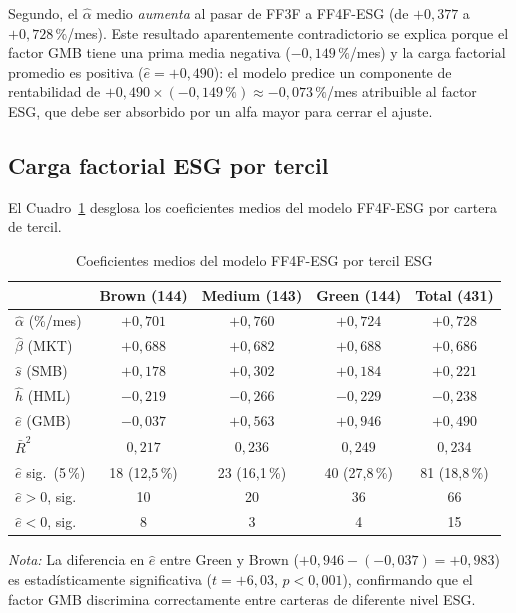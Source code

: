 \documentclass[12pt, a4paper]{article}
\begin{document}
Segundo, el $\hat\alpha$ medio \textit{aumenta} al pasar de FF3F a FF4F-ESG (de $+0{,}377$
a $+0{,}728\,\%$/mes). Este resultado aparentemente contradictorio se explica porque el
factor GMB tiene una prima media negativa ($-0{,}149\,\%$/mes) y la carga factorial
promedio es positiva ($\hat{e}=+0{,}490$): el modelo predice un componente de rentabilidad
de $+0{,}490 \times (-0{,}149\,\%) \approx -0{,}073\,\%$/mes atribuible al factor ESG,
que debe ser absorbido por un alfa mayor para cerrar el ajuste.

\subsection{Carga factorial ESG por tercil}
\label{subsec:terciles}

El Cuadro~\ref{tab:ff4f_terciles} desglosa los coeficientes medios del modelo FF4F-ESG
por cartera de tercil.

\begin{table}[H]
  \centering
  \caption{Coeficientes medios del modelo FF4F-ESG por tercil ESG}
  \label{tab:ff4f_terciles}
  \begin{tabular}{lcccc}
    \toprule
    & Brown (144) & Medium (143) & Green (144) & Total (431) \\
    \midrule
    $\hat\alpha$ (\%/mes)  & $+0{,}701$ & $+0{,}760$ & $+0{,}724$ & $+0{,}728$ \\
    $\hat\beta$ (MKT)      & $+0{,}688$ & $+0{,}682$ & $+0{,}688$ & $+0{,}686$ \\
    $\hat{s}$ (SMB)        & $+0{,}178$ & $+0{,}302$ & $+0{,}184$ & $+0{,}221$ \\
    $\hat{h}$ (HML)        & $-0{,}219$ & $-0{,}266$ & $-0{,}229$ & $-0{,}238$ \\
    $\hat{e}$ (GMB)        & $-0{,}037$ & $+0{,}563$ & $+0{,}946$ & $+0{,}490$ \\
    $\bar{R}^2$            & $0{,}217$  & $0{,}236$  & $0{,}249$  & $0{,}234$  \\
    $\hat{e}$ sig.\ (5\,\%) & 18 (12{,}5\,\%) & 23 (16{,}1\,\%) & 40 (27{,}8\,\%) & 81 (18{,}8\,\%) \\
    \quad $\hat{e}>0$, sig. & 10 & 20 & 36 & 66 \\
    \quad $\hat{e}<0$, sig. & 8  & 3  & 4  & 15 \\
    \bottomrule
  \end{tabular}
  \begin{minipage}{\linewidth}
    \small\vspace{0.3em}
    \textit{Nota:} La diferencia en $\hat{e}$ entre Green y Brown
    ($+0{,}946-(-0{,}037) = +0{,}983$) es estad\'isticamente significativa
    ($t = +6{,}03$, $p < 0{,}001$), confirmando que el factor GMB discrimina
    correctamente entre carteras de diferente nivel ESG.
  \end{minipage}
\end{table}
\end{document}
